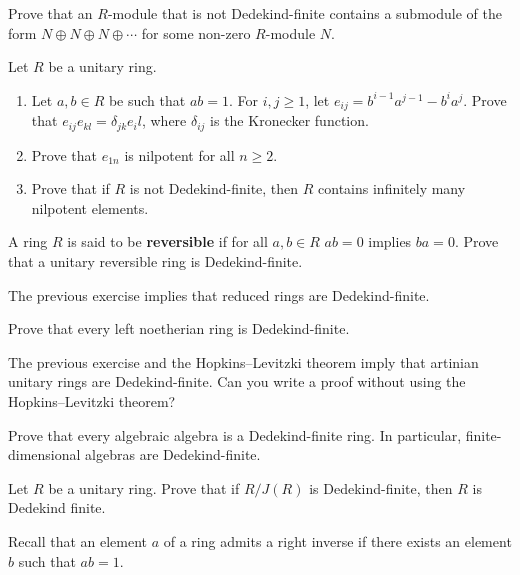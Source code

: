 \begin{exercise}
    Prove that an $R$-module that is not Dedekind-finite contains a submodule
    of the form $N\oplus N\oplus N\oplus\cdots$ for some non-zero $R$-module $N$. 
\end{exercise}

\begin{exercise}
    Let $R$ be a unitary ring. 
    \begin{enumerate}
        \item Let $a,b\in R$ be such that $ab=1$. For $i,j\geq1$, let $e_{ij}=b^{i-1}a^{j-1}-b^ia^j$. 
            Prove that $e_{ij}e_{kl}=\delta_{jk}e_il$, where $\delta_{ij}$ is the Kronecker function.
            \item Prove that $e_{1n}$ is nilpotent for all $n\geq2$.  
        \item Prove that if $R$ is not Dedekind-finite, then $R$ contains 
            infinitely many nilpotent elements. 
    \end{enumerate}
\end{exercise}

\begin{exercise}
    A ring $R$ is said to be \textbf{reversible} if for all $a,b\in R$ 
    $ab=0$ implies $ba=0$. Prove that a unitary reversible ring is Dedekind-finite. 
\end{exercise}

The previous exercise implies that reduced rings are Dedekind-finite. 

\begin{exercise}
    Prove that every left noetherian ring is Dedekind-finite. 
\end{exercise}

The previous exercise and the Hopkins--Levitzki theorem imply that 
artinian unitary rings are Dedekind-finite. Can you write a 
proof without using the Hopkins--Levitzki theorem? 

\begin{exercise}
    Prove that every algebraic algebra is a Dedekind-finite ring. In particular, 
    finite-dimensional algebras are Dedekind-finite. 
\end{exercise}

\begin{exercise}
    Let $R$ be a unitary ring. 
    Prove that if $R/J(R)$ is Dedekind-finite, then $R$ is Dedekind finite. 
\end{exercise}

Recall that an element $a$ of a ring 
admits a right inverse if there exists an element $b$ such that $ab=1$. 

